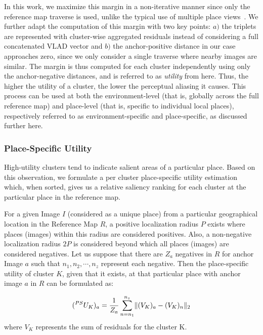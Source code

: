 \documentclass[letterpaper, 10 pt, conference]{ieeeconf}  \fi
\begin{document}
In this work, we maximize this margin in a non-iterative manner since only the reference map traverse is used, unlike the typical use of multiple place views~\cite{arandjelovic2016netvlad, revaud2019learning}. We further adapt the computation of this margin with two key points: $a)$ the triplets are represented with cluster-wise aggregated residuals instead of considering a full concatenated VLAD vector and $b)$ the anchor-positive distance in our case approaches zero, since we only consider a single traverse where nearby images are similar. The margin is thus computed for each cluster independently using only the anchor-negative distances, and is referred to as \textit{utility} from here. Thus, the higher the utility of a cluster, the lower the perceptual aliasing it causes. This process can be used at both the environment-level (that is, globally across the full reference map) and place-level (that is, specific to individual local places), respectively referred to as environment-specific and place-specific, as discussed further here.

\subsubsection{Place-Specific Utility}
\label{sec:PS}
High-utility clusters tend to indicate salient areas of a particular place. Based on this observation, we formulate a per cluster place-specific utility estimation which, when sorted, gives us a relative saliency ranking for each cluster at the particular place in the reference map.

For a given Image $I$ (considered as a unique place) from a particular geographical location in the Reference Map $R$, a positive localization radius $P$ exists where places (images) within this radius are considered positives. Also, a non-negative localization radius $2P$ is considered beyond which all places (images) are considered negatives. Let us suppose that there are $Z_a$ negatives in $R$ for anchor Image $a$ such that $n_1, n_2,\cdots, n_z$ represent each negative. Then the place-specific utility of cluster $K$, given that it exists, at that particular place with anchor image $a$ in $R$ can be formulated as:

\begin{equation}
\centering
    (_{}^{PS}U_K)_a = \frac{1}{Z_a}\sum_{n=n_1}^{n_z} \lVert (V_K)_a - (V_K)_n \rVert_2
\end{equation}
where $V_K$ represents the sum of residuals for the cluster K.
\end{document}
